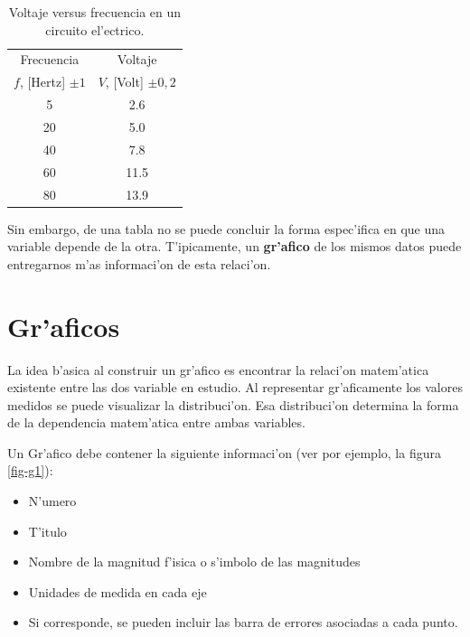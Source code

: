 \begin{table}[h!]
\begin{center}
\begin{tabular}{|c|c|}
\hline 
Frecuencia & Voltaje \\ 
$f$, [Hertz] $\pm 1$ & $V$, [Volt] $\pm 0,2$ \\ \hline
5 & 2.6 \\ \hline 
20 & 5.0 \\ \hline
40 & 7.8 \\ \hline
60 & 11.5 \\ \hline
80 & 13.9 \\ \hline
\end{tabular}
\caption{Voltaje versus frecuencia en un circuito el'ectrico.}
\label{tab-exp1}
\end{center}
\end{table}

Sin embargo, de una tabla no se puede concluir la forma espec'ifica en que
una variable depende de la otra. T'ipicamente, un \textbf{gr'afico} de los mismos datos puede entregarnos m'as informaci'on de esta relaci'on.

\section{Gr'aficos}

La idea b'asica al construir un gr'afico es encontrar la relaci'on
matem'atica existente entre las dos variable en estudio. Al representar
gr'aficamente los valores medidos se puede visualizar la distribuci'on.
Esa distribuci'on determina la forma de la dependencia matem'atica entre
ambas variables.

Un Gr'afico debe contener la siguiente informaci'on (ver por ejemplo, la figura \ref{fig-g1}):

\begin{itemize}
\item N'umero
\item T'itulo
\item Nombre de la magnitud f'isica o s'imbolo de las magnitudes
\item Unidades de medida en cada eje
\item Si corresponde, se pueden incluir las barra de errores asociadas a cada punto.
\end{itemize}

